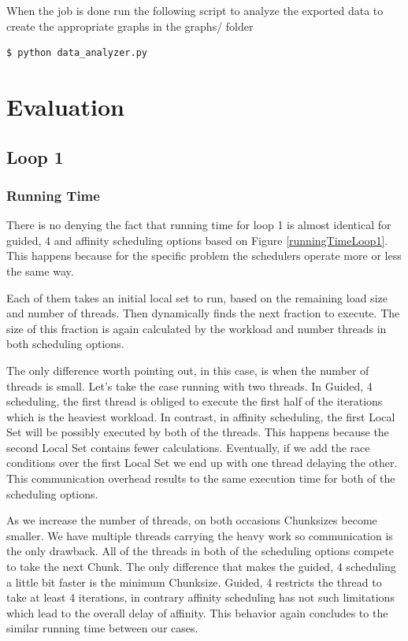 \documentclass[12pt,a4paper]{article}
\begin{document}
When the job is done run the following script to analyze the exported data to create the appropriate graphs in the graphs/ folder
\begin{lstlisting}[language=bash]
  $ python data_analyzer.py
\end{lstlisting}

\section{Evaluation}

\subsection{Loop 1}

\subsubsection{Running Time}

There is no denying the fact that running time for loop 1 is almost identical for guided, 4 and affinity scheduling options based on Figure \ref{runningTimeLoop1}. This happens because for the specific problem the schedulers operate more or less the same way.

Each of them takes an initial local set to run, based on the remaining load size and number of threads. Then dynamically finds the next fraction to execute. The size of this fraction is again calculated by the workload and number threads in both scheduling options.

The only difference worth pointing out, in this case, is when the number of threads is small. Let's take the case running with two threads. In Guided, 4 scheduling, the first thread is obliged to execute the first half of the iterations which is the heaviest workload. In contrast, in affinity scheduling, the first Local Set will be possibly executed by both of the threads. This happens because the second Local Set contains fewer calculations. Eventually, if we add the race conditions over the first Local Set we end up with one thread delaying the other. This communication overhead results to the same execution time for both of the scheduling options.

As we increase the number of threads, on both occasions Chunksizes become smaller. We have multiple threads carrying the heavy work so communication is the only drawback. All of the threads in both of the scheduling options compete to take the next Chunk. The only difference that makes the guided, 4 scheduling a little bit faster is the minimum Chunksize. Guided, 4 restricts the thread to take at least 4 iterations, in contrary affinity scheduling has not such limitations which lead to the overall delay of affinity. This behavior again concludes to the similar running time between our cases.
\end{document}
